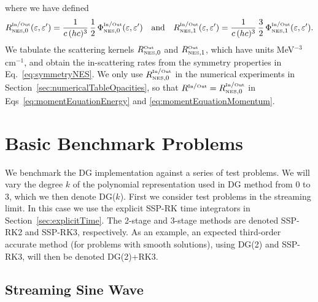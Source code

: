 \documentclass[10pt,preprint]{aastex}
\newcommand{\NES}{\mbox{\tiny NES}}
\begin{document}
where we have defined
\begin{equation}
  R_{\NES,0}^{\In/\Out}(\epsilonNu,\epsilonNu')
  =\f{1}{c\,(hc)^{3}}\,\f{1}{2}\,\Phi_{\NES,0}^{\In/\Out}(\epsilonNu,\epsilonNu')
  \quad\text{and}\quad
  R_{\NES,1}^{\In/\Out}(\epsilonNu,\epsilonNu')
  =\f{1}{c\,(hc)^{3}}\,\f{3}{2}\,\Phi_{\NES,1}^{\In/\Out}(\epsilonNu,\epsilonNu').  
\end{equation}
We tabulate the scattering kernels $R_{\NES,0}^{\Out}$ and $R_{\NES,1}^{\Out}$, which have units MeV$^{-3}$ cm$^{-1}$, and obtain the in-scattering rates from the symmetry properties in Eq.~\eqref{eq:symmetryNES}.  
We only use $R_{\NES,0}^{\In/\Out}$ in the numerical experiments in Section~\ref{sec:numericalTableOpacities}, so that $R^{\In/\Out}=R_{\NES,0}^{\In/\Out}$ in Eqs~\eqref{eq:momentEquationEnergy} and \eqref{eq:momentEquationMomentum}.  

\section{Basic Benchmark Problems}
\label{sec:numericalBasic}

We benchmark the DG implementation against a series of test problems.  
We will vary the degree $k$ of the polynomial representation used in DG method from 0 to 3, which we then denote DG($k$).  
First we consider test problems in the streaming limit.  
In this case we use the explicit SSP-RK time integrators in Section~\ref{sec:explicitTime}.  
The 2-stage and 3-stage methods are denoted SSP-RK2 and SSP-RK3, respectively.  
As an example, an expected third-order accurate method (for problems with smooth solutions), using DG(2) and SSP-RK3, will then be denoted DG(2)+RK3.  

\subsection{Streaming Sine Wave}
\end{document}
